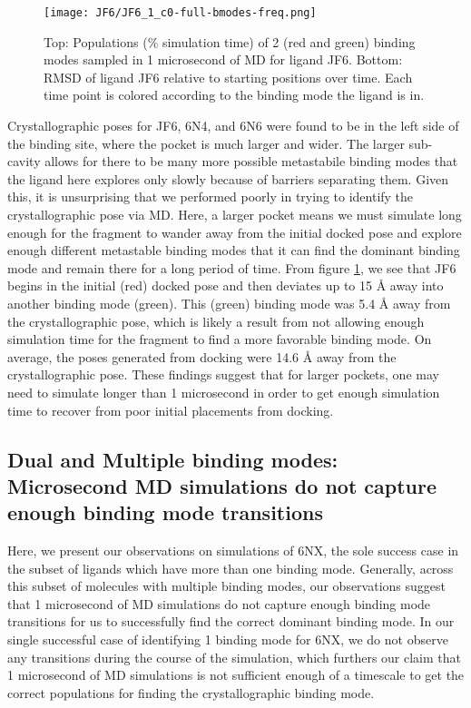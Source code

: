 \documentclass[journal=jcisd8,manuscript=article]{achemso}
\begin{document}
\begin{figure}
    \centering
    \texttt{[image: JF6/JF6\_1\_c0-full-bmodes-freq.png]}
    \caption[Ligand JF6 Binding Mode Populations]{Top: Populations (\% simulation time) of 2 (red and green) binding modes sampled in 1 microsecond of MD for ligand JF6. Bottom: RMSD of ligand JF6 relative to starting positions over time. Each time point is colored according to the binding mode the ligand is in.}
    \label{fig:JF6_bmodes}
\end{figure}

Crystallographic poses for JF6, 6N4, and 6N6 were found to be in the left side of the binding site, where the pocket is much larger and wider.
The larger sub-cavity allows for there to be many more possible metastabile binding modes that the ligand here explores only slowly because of barriers separating them.
Given this, it is unsurprising that we performed poorly in trying to identify the crystallographic pose via MD.
Here, a larger pocket means we must simulate long enough for the fragment to wander away from the initial docked pose and explore enough different metastable binding modes that it can find the dominant binding mode and remain there for a long period of time.
From figure \ref{fig:JF6_bmodes}, we see that JF6 begins in the initial (red) docked pose and then deviates up to 15 {\AA} away into another binding mode (green).
This (green) binding mode was 5.4 {\AA} away from the crystallographic pose, which is likely a result from not allowing enough simulation time for the fragment to find a more favorable binding mode.
On average, the poses generated from docking were 14.6 {\AA} away from the crystallographic pose.
These findings suggest that for larger pockets, one may need to simulate longer than 1 microsecond in order to get enough simulation time to recover from poor initial placements from docking.

\subsection{Dual and Multiple binding modes: Microsecond MD simulations do not capture enough binding mode transitions}
Here, we present our observations on simulations of 6NX, the sole success case in the subset of ligands which have more than one binding mode.
Generally, across this subset of molecules with multiple binding modes, our observations suggest that 1 microsecond of MD simulations do not capture enough binding mode transitions for us to successfully find the correct dominant binding mode.
In our single successful case of identifying 1 binding mode for 6NX, we do not observe any transitions during the course of the simulation, which furthers our claim that 1 microsecond of MD simulations is not sufficient enough of a timescale to get the correct populations for finding the crystallographic binding mode.
\end{document}
